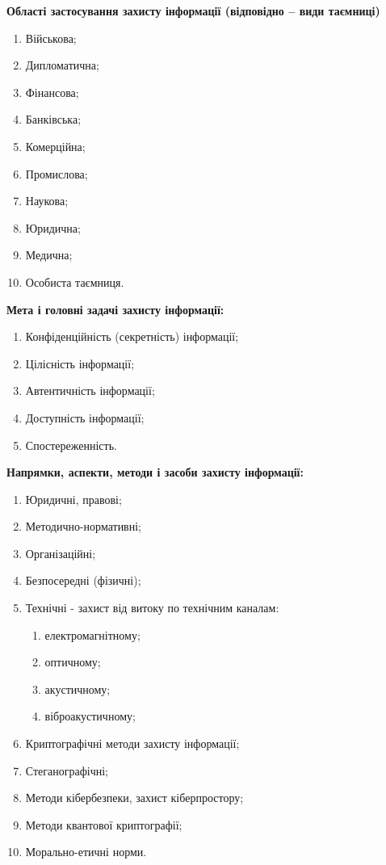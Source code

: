 \textbf{Області застосування захисту інформації (відповідно – види таємниці)}
\begin{enumerate}
    \item Військова;
    \item Дипломатична;
    \item Фінансова;
    \item Банківська;
    \item Комерційна;
    \item Промислова;
    \item Наукова;
    \item Юридична;
    \item Медична;
    \item Особиста таємниця.
\end{enumerate}

\textbf{Мета і головні задачі захисту інформації:}
\begin{enumerate}
    \item Конфіденційність (секретність) інформації;
    \item Цілісність інформації;
    \item Автентичність інформації;
    \item Доступність інформації;
    \item Спостереженність.
\end{enumerate}

\textbf{Напрямки, аспекти, методи і засоби захисту інформації:}
\begin{enumerate}
    \item Юридичні, правові;
    \item Методично-нормативні;
    \item Організаційні;
    \item Безпосередні (фізичні);
    \item Технічні - захист від витоку по технічним каналам:
        \begin{enumerate}
            \item електромагнітному;
            \item оптичному;
            \item акустичному;
            \item віброакустичному;
        \end{enumerate}
    \item Криптографічні методи захисту інформації;
    \item Стеганографічні;
    \item Методи кібербезпеки, захист кіберпростору;
    \item Методи квантової криптографії;
    \item Морально-етичні норми.
\end{enumerate}


